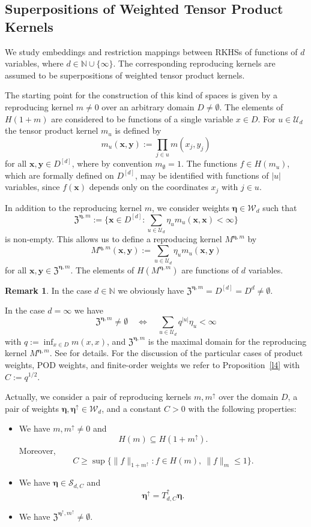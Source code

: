 \documentclass{article}
\newcommand{\N}  {{\mathbb N}}
\newcommand{\bx}{{\mathbf x}}
\newcommand{\by}{{\mathbf y}}
\newcommand{\be}{{\boldsymbol{\eta}}}
\newcommand{\Z}{{\mathfrak Z}}
\newcommand{\U}  {\mathcal{U}}
\newcommand{\W}  {\mathcal{W}}
\newcommand{\SSS}{\mathcal{S}}
\newcommand{\up}{\uparrow}
\theoremstyle{plain}
\theoremstyle{definition}
\newtheorem{rem}{Remark}
\begin{document}
\subsection{Superpositions of Weighted Tensor Product Kernels}
\label{s4.1}

We study embeddings and restriction mappings 
between RKHSs of functions of $d$ variables,
where $d \in \N \cup \{\infty\}$. The corresponding reproducing
kernels are assumed to be superpositions of weighted tensor product
kernels.

The starting point for the construction of 
this kind of spaces is given by a 
reproducing kernel $m \neq 0$ over an arbitrary domain
$D \neq \emptyset$.
The elements of $H(1+m)$ 
are considered to be functions of a single variable $x \in D$.
For $u\in \U_d$ the tensor product kernel $m_{u}$ is defined by
\[
m_{u}(\bx,\by) := \prod_{j\in u} m(x_j, y_j)
\]
for all $\bx, \by\in D^{[d]}$,
where by convention $m_{\emptyset} = 1$. 
The functions $f \in H(m_u)$, which are formally defined
on $D^{[d]}$, may be identified with functions of $|u|$ variables,
since $f(\bx)$ depends only on the coordinates 
$x_j$ with $j\in u$. 

In addition to the reproducing kernel $m$, we consider weights 
$\be \in \W_d$ such that 
\[
\Z^{\be,m} := \biggl\{\bx \in D^{[d]} : 
\sum_{u\in \U_d} \eta_u m_u(\bx, \bx) <\infty \biggr\}
\]
is non-empty.
This allows us to define a reproducing kernel $M^{\be,m}$ by
\[
M^{\be,m} (\bx, \by) := \sum_{u\in\U_d} \eta_u m_u(\bx, \by)
\]
for all $\bx, \by \in \Z^{\be,m}$. The elements of $H(M^{\be,m})$ are 
functions of $d$ variables.

\begin{rem}\label{r4}
In the case $d \in \N$ we obviously have 
$\Z^{\be,m} = D^{[d]} = D^d \neq \emptyset$.

In the case $d = \infty$ we have
\[
\Z^{\be,m} \neq \emptyset \quad \Leftrightarrow \quad
\sum_{u \in \U_d} q^{|u|} \eta_u < \infty
\]
with $q := \inf_{x \in D} m(x,x)$,
and $\Z^{\be,m}$ is the maximal domain for the 
reproducing kernel $M^{\be,m}$. See \citet[Sec.~2]{GMR12} for
details.  
For the discussion of the particular cases of product weights, POD
weights, and finite-order weights we refer to 
Proposition~\ref{l4} with $C := q^{1/2}$.
\end{rem}

Actually, we consider a pair of reproducing kernels 
$m,m^\up$ over the domain $D$,
a pair of weights $\be, \be^\up \in \W_d$,
and a constant $C > 0$
with the following properties:
\begin{itemize}
\item[(A1)]
We have $m,m^\up \neq 0$ and
\[
H(m)\subseteq H(1+m^\up).
\]
Moreover,
\[
C \geq
\sup \{ \|f\|_{1+m^\up} : f \in H(m),\ \|f\|_m \leq 1\}.
\]
\item[(A2)]
We have $\be \in \SSS_{d,C}$ and
\[
\be^{\up} = T_{d,C}^\up \be.
\]
\item[(A3)]
We have 
$\Z^{\be^\up\!,m^\up} \neq \emptyset$.
\end{itemize}
\end{document}
